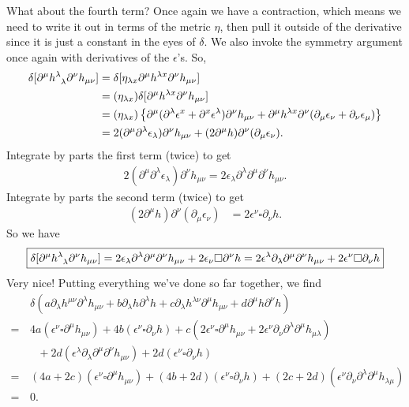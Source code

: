 \documentclass{book}
\theoremstyle{definition}
\newcommand{\p}{\partial}
\newcommand{\nn}{\nonumber}
\newcommand{\lc}{\left\{}
\newcommand{\rc}{\right\}}
\begin{document}
What about the fourth term? Once again we have a contraction, which means we need to write it out in terms of the metric $\eta$, then pull it outside of the derivative since it is just a constant in the eyes of $\delta$. We also invoke the symmetry argument once again with derivatives of the $\epsilon$'s. So,
\begin{align}
\delta[\p^\mu\tensor{h}{^\lambda_\lambda}\p^\nu h_{\mu\nu} ] &= \delta[\eta_{\lambda x}\p^\mu h^{\lambda x}  \p^\nu h_{\mu\nu}]\nn\\
&= (\eta_{\lambda x})\delta[ \p^\mu h^{\lambda x} \p^\nu h_{\mu\nu}]\nn\\
&= (\eta_{\lambda x})\lc \p^\mu(\p^\lambda \epsilon^x + \p^x \epsilon^\lambda)\p^\nu h_{\mu\nu} + \p^\mu h^{\lambda x}  \p^\nu (\p_\mu \epsilon_\nu + \p_\nu \epsilon_\mu) \rc\nn\\
&= 2(\p^\mu\p^\lambda \epsilon_\lambda) \p^\nu h_{\mu\nu} + (2\p^\mu h) \p^\nu(\p_\mu\epsilon_\nu).
\end{align}
Integrate by parts the first term (twice) to get
\begin{align}
2 (\p^\mu \p^\lambda \epsilon_\lambda)\p^\nu h_{\mu\nu} = 2\epsilon_\lambda \p^\lambda \p^\mu \p^\nu h_{\mu\nu}.
\end{align}
Integrate by parts the second term (twice) to get
\begin{align}
(2\p^\mu h) \p^\nu(\p_\mu\epsilon_\nu) &= 2\epsilon^\nu \square \p_\nu h.
\end{align}
So we have
\begin{align}
\boxed{\delta[\p^\mu\tensor{h}{^\lambda_\lambda} \p^\nu h_{\mu\nu}] = 2\epsilon_\lambda \p^\lambda \p^\mu \p^\nu h_{\mu\nu} + 2\epsilon_\nu\square \p^\nu h =  2\epsilon^\lambda \p_\lambda \p^\mu \p^\nu h_{\mu\nu}  + 2\epsilon^\nu\square \p_\nu h}
\end{align}
Very nice! Putting everything we've done so far together, we find
\begin{align}
&\,\delta(a\p_\lambda h^{\mu\nu}\p^\lambda h_{\mu\nu} + b \p_\lambda h \p^\lambda h + c\p_\lambda h^{\lambda \nu}\p^\mu h_{\mu\nu} + d\p^\mu h \p^\nu h )\nn\\
= &\,4a(\epsilon^\nu \square \p^\mu h_{\mu\nu}) + 4b(\epsilon^\nu \square \p_\nu h) + c (2\epsilon^\nu\square\p^\mu h_{\mu\nu} + 2\epsilon^\nu \p_\nu \p^\lambda  \p^\mu h_{\mu\lambda}) \nn \\ &\,\,\,\,\,+ 2d(\epsilon^\lambda \p_\lambda \p^\mu\p^\nu h_{\mu\nu}) + 2d(\epsilon^\nu \square \p_\nu h)\nn\\
= &\,(4a+2c)(\epsilon^\nu \square \p^\mu h_{\mu\nu}) + (4b + 2d)(\epsilon^\nu \square \p_\nu h) + (2c+ 2d)(\epsilon^\nu \p_\nu \p^\lambda\p^\mu h_{\lambda\mu})\nn\\
= & \,0.
\end{align} 
\end{document}
